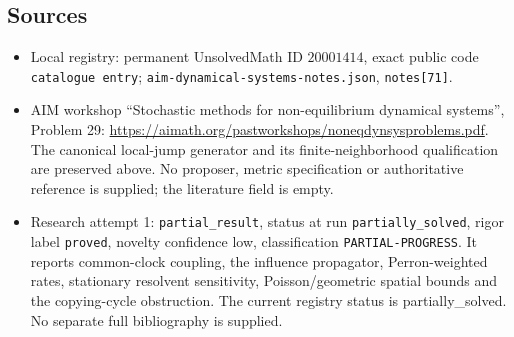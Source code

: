 \documentclass[11pt]{article}
\begin{document}
\subsection{Sources}
\begin{itemize}
\item Local registry: permanent UnsolvedMath ID \(20001414\), exact public code \texttt{catalogue entry}; \texttt{aim-dynamical-systems-notes.json}, \texttt{notes[71]}.
\item AIM workshop ``Stochastic methods for non-equilibrium dynamical systems'', Problem 29: \url{https://aimath.org/pastworkshops/noneqdynsysproblems.pdf}. The canonical local-jump generator and its finite-neighborhood qualification are preserved above. No proposer, metric specification or authoritative reference is supplied; the literature field is empty.
\item Research attempt 1: \texttt{partial\_result}, status at run \texttt{partially\_solved}, rigor label \texttt{proved}, novelty confidence low, classification \texttt{PARTIAL-PROGRESS}. It reports common-clock coupling, the influence propagator, Perron-weighted rates, stationary resolvent sensitivity, Poisson/geometric spatial bounds and the copying-cycle obstruction. The current registry status is partially_solved. No separate full bibliography is supplied.
\end{itemize}
\end{document}
